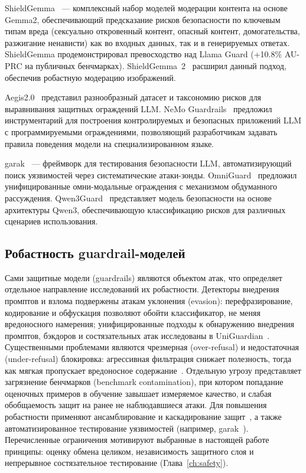 ShieldGemma~\cite{2407.21772} --- комплексный набор моделей модерации контента на основе Gemma2, обеспечивающий предсказание рисков безопасности по ключевым типам вреда (сексуально откровенный контент, опасный контент, домогательства, разжигание ненависти) как во входных данных, так и в генерируемых ответах. ShieldGemma продемонстрировал превосходство над Llama Guard (+10.8\% AU-PRC на публичных бенчмарках). ShieldGemma~2~\cite{2504.01081} расширил данный подход, обеспечив робастную модерацию изображений.

Aegis2.0~\cite{2501.09004} представил разнообразный датасет и таксономию рисков для выравнивания защитных ограждений LLM. NeMo Guardrails~\cite{2310.10501} предложил инструментарий для построения контролируемых и безопасных приложений LLM с программируемыми ограждениями, позволяющий разработчикам задавать правила поведения модели на специализированном языке.

garak~\cite{2406.11036} --- фреймворк для тестирования безопасности LLM, автоматизирующий поиск уязвимостей через систематические атаки-зонды. OmniGuard~\cite{2512.02306} предложил унифицированные омни-модальные ограждения с механизмом обдуманного рассуждения. Qwen3Guard~\cite{2510.14276} представляет модель безопасности на основе архитектуры Qwen3, обеспечивающую классификацию рисков для различных сценариев использования.

\subsection{Робастность guardrail-моделей}\label{subsec:guardrail_robustness}

Сами защитные модели (guardrails) являются объектом атак, что определяет отдельное направление исследований их робастности. Детекторы внедрения промптов и взлома подвержены атакам уклонения (evasion): перефразирование, кодирование и обфускация позволяют обойти классификатор, не меняя вредоносного намерения; унифицированные подходы к обнаружению внедрения промптов, бэкдоров и состязательных атак исследованы в UniGuardian~\cite{2502.13141}. Существенными проблемами являются чрезмерная (over-refusal) и недостаточная (under-refusal) блокировка: агрессивная фильтрация снижает полезность, тогда как мягкая пропускает вредоносное содержание~\cite{2406.17806}. Отдельную угрозу представляет загрязнение бенчмарков (benchmark contamination), при котором попадание оценочных примеров в обучение завышает измеряемое качество, и слабая обобщаемость защит на ранее не наблюдавшиеся атаки. Для повышения робастности применяют ансамблирование и каскадирование защит~\cite{2502.14486}, а также автоматизированное тестирование уязвимостей (например, garak~\cite{2406.11036}). Перечисленные ограничения мотивируют выбранные в настоящей работе принципы: оценку обмена целиком, независимость защитного слоя и непрерывное состязательное тестирование (Глава~\ref{ch:safety}).

